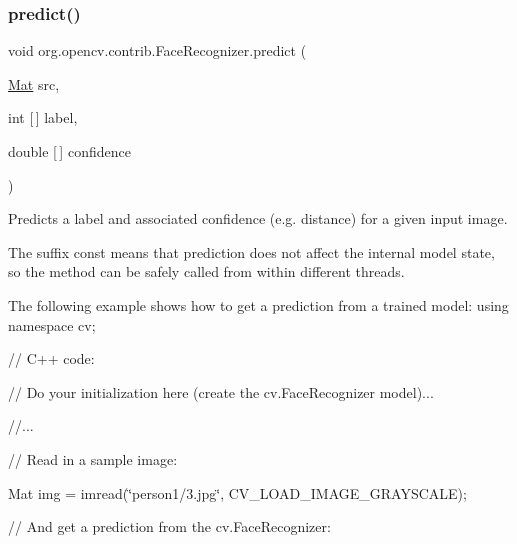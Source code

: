 \subsubsection{\texorpdfstring{predict()}{predict()}}
{\footnotesize\ttfamily void org.\+opencv.\+contrib.\+Face\+Recognizer.\+predict (\begin{DoxyParamCaption}\item[{\mbox{\hyperlink{classorg_1_1opencv_1_1core_1_1_mat}{Mat}}}]{src,  }\item[{int \mbox{[}$\,$\mbox{]}}]{label,  }\item[{double \mbox{[}$\,$\mbox{]}}]{confidence }\end{DoxyParamCaption})}

Predicts a label and associated confidence (e.\+g. distance) for a given input image.

The suffix {\ttfamily const} means that prediction does not affect the internal model state, so the method can be safely called from within different threads.

The following example shows how to get a prediction from a trained model\+: using namespace cv; {\ttfamily }

{\ttfamily }

{\ttfamily }

{\ttfamily // C++ code\+:}

{\ttfamily }

{\ttfamily }

{\ttfamily // Do your initialization here (create the cv.\+Face\+Recognizer model)...}

{\ttfamily }

{\ttfamily }

{\ttfamily //...}

{\ttfamily }

{\ttfamily }

{\ttfamily // Read in a sample image\+:}

{\ttfamily }

{\ttfamily }

{\ttfamily Mat img = imread(\char`\"{}person1/3.\+jpg\char`\"{}, C\+V\+\_\+\+L\+O\+A\+D\+\_\+\+I\+M\+A\+G\+E\+\_\+\+G\+R\+A\+Y\+S\+C\+A\+LE);}

{\ttfamily }

{\ttfamily }

{\ttfamily // And get a prediction from the cv.\+Face\+Recognizer\+:}

{\ttfamily }

{\ttfamily }

